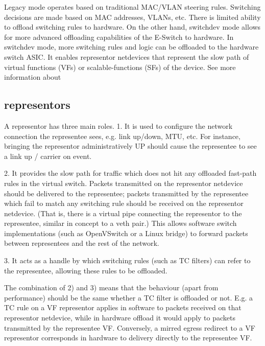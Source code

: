 \documentclass[letterpaper]{article}
\begin{document}
Legacy mode operates based on traditional MAC/VLAN steering rules. Switching
decisions are made based on MAC addresses, VLANs, etc. There is limited ability
to offload switching rules to hardware.
On the other hand, switchdev mode allows for more advanced offloading
capabilities of the E-Switch to hardware. In switchdev mode, more switching
rules and logic can be offloaded to the hardware switch ASIC. It enables
representor netdevices that represent the slow path of virtual functions (VFs)
or scalable-functions (SFs) of the device. See more information about

\subsection{representors}

A representor has three main roles.
1. It is used to configure the network connection the representee sees, e.g.
   link up/down, MTU, etc.  For instance, bringing the representor
administratively UP should cause the representee to see a link up / carrier
   on event.

2. It provides the slow path for traffic which does not hit any offloaded
   fast-path rules in the virtual switch.  Packets transmitted on the
   representor netdevice should be delivered to the representee; packets
  transmitted by the representee which fail to match any switching rule should
  be received on the representor netdevice.  (That is, there is a virtual pipe 
  connecting the representor to the representee, similar in concept to a veth
  pair.)
  This allows software switch implementations (such as OpenVSwitch or a Linux
   bridge) to forward packets between representees and the rest of the network.
   
 3. It acts as a handle by which switching rules (such as TC filters) can refer
 to the representee, allowing these rules to be offloaded.

 
 The combination of 2) and 3) means that the behaviour (apart from performance)
 should be the same whether a TC filter is offloaded or not.  E.g. a TC rule
 on a VF representor applies in software to packets received on that representor
 netdevice, while in hardware offload it would apply to packets transmitted by
  the representee VF.  Conversely, a mirred egress redirect to a VF representor
  corresponds in hardware to delivery directly to the representee VF.
 
\end{document}
